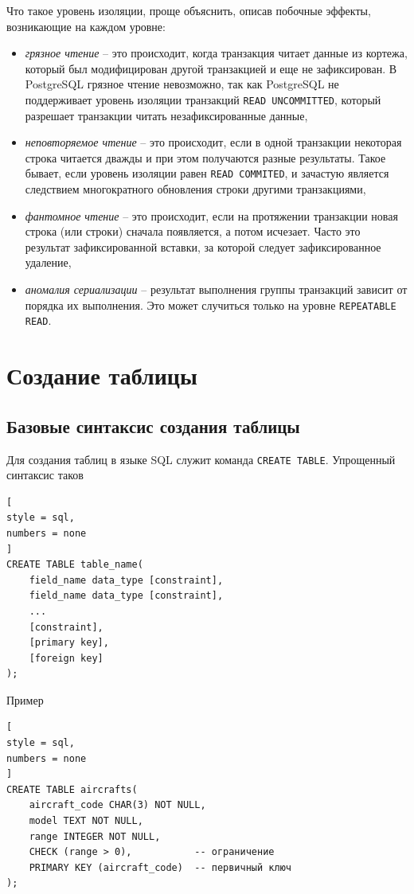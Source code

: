 \documentclass[%
	11pt,
	a4paper,
	utf8,
		]{article}
\begin{document}
Что такое уровень изоляции, проще объяснить, описав побочные эффекты, возникающие на каждом уровне:
\begin{itemize}
	\item \emph{грязное чтение} -- это происходит, когда транзакция читает данные из кортежа, который был модифицирован другой транзакцией и еще не зафиксирован. В PostgreSQL грязное чтение невозможно, так как PostgreSQL не поддерживает уровень изоляции транзакций \texttt{READ UNCOMMITTED}, который разрешает транзакции читать незафиксированные данные,
	
	\item \emph{неповторяемое чтение} -- это происходит, если в одной транзакции некоторая строка читается дважды и при этом получаются разные результаты. Такое бывает, если уровень изоляции равен \texttt{READ COMMITED}, и зачастую является следствием многократного обновления строки другими транзакциями,
	
	\item \emph{фантомное чтение} -- это происходит, если на протяжении транзакции новая строка (или строки) сначала появляется, а потом исчезает. Часто это результат зафиксированной вставки, за которой следует зафиксированное удаление,
	
	\item \emph{аномалия сериализации} -- результат выполнения группы транзакций зависит от порядка их выполнения. Это может случиться только на уровне \texttt{REPEATABLE READ}.
\end{itemize}



\section{Создание таблицы}

\subsection{Базовые синтаксис создания таблицы}

Для создания таблиц в языке SQL служит команда \texttt{CREATE TABLE}. Упрощенный синтаксис таков
\begin{lstlisting}[
style = sql,
numbers = none
]
CREATE TABLE table_name(
    field_name data_type [constraint],
    field_name data_type [constraint],
    ...
    [constraint],
    [primary key],
    [foreign key]
);
\end{lstlisting}

Пример
\begin{lstlisting}[
style = sql,
numbers = none
]
CREATE TABLE aircrafts(
    aircraft_code CHAR(3) NOT NULL,
    model TEXT NOT NULL,
    range INTEGER NOT NULL,
    CHECK (range > 0),           -- ограничение
    PRIMARY KEY (aircraft_code)  -- первичный ключ
);
\end{lstlisting}
\end{document}
